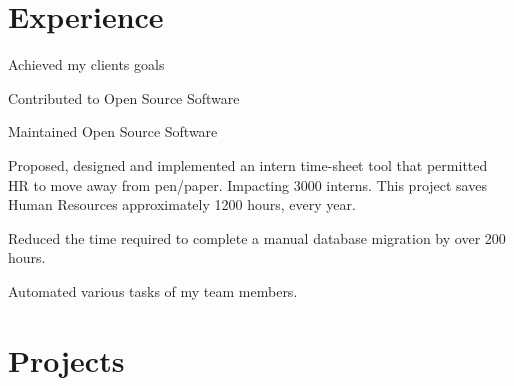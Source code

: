 \documentclass[letterpaper]{deedy-resume} %
\begin{document}
\begin{minipage}[t]{0.66\textwidth} %


\section{Experience}



\vspace{\topsep} %
\begin{tightitemize}
    \item Achieved my clients goals
    \item Contributed to Open Source Software
    \item Maintained Open Source Software
\end{tightitemize}

\sectionspace %


\begin{tightitemize}
\item Proposed, designed and implemented an intern time-sheet tool that
  permitted HR to move away from pen/paper. Impacting 3000 interns.
  This project saves Human Resources approximately 1200 hours, every year.
\item Reduced the time required to complete a manual database
  migration by over 200 hours.
\item Automated various tasks of my team members.
\end{tightitemize}

\sectionspace %


\section{Projects}


\end{minipage}
\end{document}
